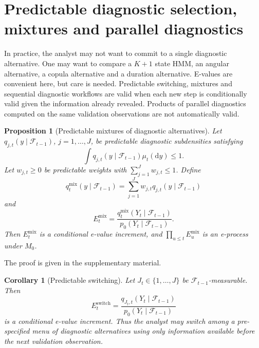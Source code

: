 \documentclass[pdflatex,sn-basic]{sn-jnl}
\theoremstyle{thmstyleone}
\newtheorem{proposition}[theorem]{Proposition}
\newtheorem{corollary}[theorem]{Corollary}
\theoremstyle{thmstyletwo}
\theoremstyle{thmstylethree}
\newcommand{\1}{\mathbf 1}
\newcommand{\calF}{\mathcal F}
\begin{document}
\section{Predictable diagnostic selection, mixtures and parallel diagnostics}
\label{sec:mixtures}

In practice, the analyst may not want to commit to a single diagnostic alternative. One may want to compare a $K+1$ state HMM, an angular alternative, a copula alternative and a duration alternative. E-values are convenient here, but care is needed. Predictable switching, mixtures and sequential diagnostic workflows are valid when each new step is conditionally valid given the information already revealed. Products of parallel diagnostics computed on the same validation observations are not automatically valid.

\begin{proposition}[Predictable mixtures of diagnostic alternatives]
\label{prop:mixtures}
Let $q_{j,t}(y\mid\calF_{t-1})$, $j=1,\ldots,J$, be predictable diagnostic subdensities satisfying
\[
 \int q_{j,t}(y\mid\calF_{t-1})\mu_t(\mathrm dy)\leq1.
\]
Let $w_{j,t}\geq0$ be predictable weights with $\sum_{j=1}^Jw_{j,t}\leq1$. Define
\begin{equation}
 q_t^{\mathrm{mix}}(y\mid\calF_{t-1})=\sum_{j=1}^Jw_{j,t}q_{j,t}(y\mid\calF_{t-1})
\end{equation}
and
\begin{equation}
 E_t^{\mathrm{mix}}=\frac{q_t^{\mathrm{mix}}(Y_t\mid\calF_{t-1})}{p_0(Y_t\mid\calF_{t-1})}.
\end{equation}
Then $E_t^{\mathrm{mix}}$ is a conditional e-value increment, and $\prod_{u\leq t}E_u^{\mathrm{mix}}$ is an e-process under $M_0$.
\end{proposition}

\noindent The proof is given in the supplementary material.

\begin{corollary}[Predictable switching]
\label{cor:switching}
Let $J_t\in\{1,\ldots,J\}$ be $\calF_{t-1}$-measurable. Then
\begin{equation}
 E_t^{\mathrm{switch}}=\frac{q_{J_t,t}(Y_t\mid\calF_{t-1})}{p_0(Y_t\mid\calF_{t-1})}
\end{equation}
is a conditional e-value increment. Thus the analyst may switch among a pre-specified menu of diagnostic alternatives using only information available before the next validation observation.
\end{corollary}
\end{document}
